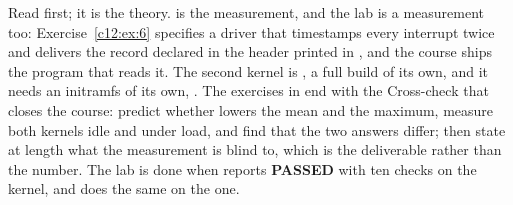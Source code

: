Read  first; it is the theory.  is the measurement, and the lab
is a measurement too: Exercise~\ref{c12:ex:6} specifies a driver that timestamps every interrupt
twice and delivers the record declared in the header printed in , and the course
ships the program that reads it. The second kernel is , a full build of its
own, and it needs an initramfs of its own, . The exercises in
 end with the Cross-check that closes the course: predict whether
 lowers the mean and the maximum, measure both kernels idle and under load, and
find that the two answers differ; then state at length what the measurement is blind to, which is
the deliverable rather than the number. The lab is done when  reports
\textbf{PASSED} with ten checks on the  kernel, and  does
the same on the  one.






